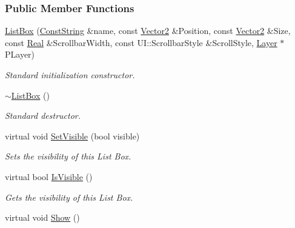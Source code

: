 \subsubsection*{Public Member Functions}
\begin{DoxyCompactItemize}
\item 
\hyperlink{classphys_1_1UI_1_1ListBox_a2cda27f0fd7392a5e0293af644a215ef}{ListBox} (\hyperlink{namespacephys_a5ce5049f8b4bf88d6413c47b504ebb31}{ConstString} \&name, const \hyperlink{classphys_1_1Vector2}{Vector2} \&Position, const \hyperlink{classphys_1_1Vector2}{Vector2} \&Size, const \hyperlink{namespacephys_af7eb897198d265b8e868f45240230d5f}{Real} \&ScrollbarWidth, const UI::ScrollbarStyle \&ScrollStyle, \hyperlink{classphys_1_1UI_1_1Layer}{Layer} $\ast$PLayer)
\begin{DoxyCompactList}\small\item\em Standard initialization constructor. \item\end{DoxyCompactList}\item 
\hypertarget{classphys_1_1UI_1_1ListBox_a582423223a2e310afc2a32c84d937502}{
\hyperlink{classphys_1_1UI_1_1ListBox_a582423223a2e310afc2a32c84d937502}{$\sim$ListBox} ()}
\label{classphys_1_1UI_1_1ListBox_a582423223a2e310afc2a32c84d937502}

\begin{DoxyCompactList}\small\item\em Standard destructor. \item\end{DoxyCompactList}\item 
virtual void \hyperlink{classphys_1_1UI_1_1ListBox_abb3c87bf6669100296c1fa4f4913ea33}{SetVisible} (bool visible)
\begin{DoxyCompactList}\small\item\em Sets the visibility of this List Box. \item\end{DoxyCompactList}\item 
virtual bool \hyperlink{classphys_1_1UI_1_1ListBox_a638f19eb6e5a0bd3291fab1ebaccc84f}{IsVisible} ()
\begin{DoxyCompactList}\small\item\em Gets the visibility of this List Box. \item\end{DoxyCompactList}\item 
\hypertarget{classphys_1_1UI_1_1ListBox_add82890a307bc8fc984a0a029cfb88ae}{
virtual void \hyperlink{classphys_1_1UI_1_1ListBox_add82890a307bc8fc984a0a029cfb88ae}{Show} ()}
\label{classphys_1_1UI_1_1ListBox_add82890a307bc8fc984a0a029cfb88ae}


\end{DoxyCompactItemize}
